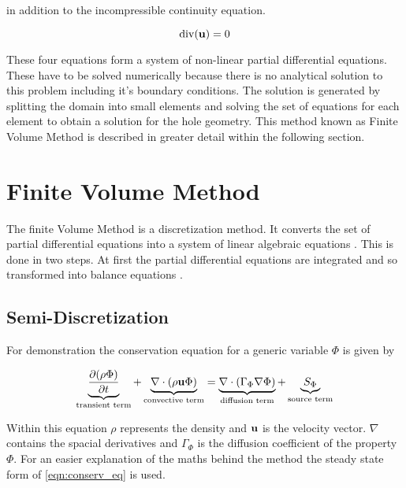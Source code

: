 \documentclass[../thesis.tex]{subfiles}
\begin{document}
in addition to the incompressible continuity equation.

\begin{equation}
	\label{eqn:continuity}
	\mathrm{div}(\bold{u}) = 0
\end{equation}

These four equations form a system of non-linear partial differential equations. These have to be solved numerically because there is no analytical solution to this problem including it's boundary conditions. The solution is generated by splitting the domain into small elements and solving the set of equations for each element to obtain a solution for the hole geometry. This method known as Finite Volume Method is described in greater detail within the following section.

\section{Finite Volume Method}

The finite Volume Method is a discretization method. It converts the set of partial differential equations into a system of linear algebraic equations \cite{darwish2021finite}. This is done in two steps. At first the partial differential equations are integrated and so transformed into balance equations \cite{darwish2021finite}. 

\subsection{Semi-Discretization}

For demonstration the conservation equation for a generic variable $ \Phi $ is given by

\begin{equation}
	\label{eqn:conserv_eq}
	\underbrace{\dfrac{\partial(\rho \Phi)}{\partial t}}_{\text{transient term}} + \underbrace{\nabla \cdot (\rho \bold{u} \Phi)}_{\text{convective term}} = \underbrace{\nabla \cdot (\Gamma_\Phi \nabla \Phi)}_{\text{diffusion term}} + \underbrace{S_\Phi}_{\text{source term}}
\end{equation}

Within this equation $ \rho $ represents the density and $ \bold{u} $ is the velocity vector. $ \nabla $ contains the spacial derivatives and $ \Gamma_\Phi $ is the diffusion coefficient of the property $ \Phi $.
For an easier explanation of the maths behind the method the steady state form of \autoref{eqn:conserv_eq} is used.
\end{document}
